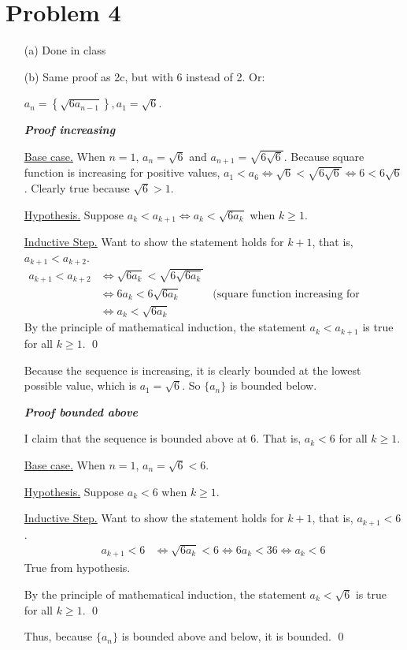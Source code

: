 \documentclass[preview, margin=0.6in]{standalone}
\newcommand*{\problem}[1]{\section*{Problem #1}}
\begin{document}
\problem{4}
\begin{itemize}
	\item[(a)] Done in class
	\item[(b)] Same proof as 2c, but with 6 instead of 2. Or:

$\displaystyle a_n=\left\{\sqrt{6a_{n-1}}\right\},a_1=\sqrt{6}$.

\textbf{\textit{Proof increasing}}

\underline{Base case.} When $n=1$, $a_n=\sqrt{6}$ and $a_{n+1}=\sqrt{6 \sqrt{6}}$. Because square function is increasing for positive values, $a_1<a_6 \iff \sqrt{6} < \sqrt{6 \sqrt{6}} \iff 6 < 6 \sqrt{6}$. Clearly true because $ \sqrt{6}>1$.

\underline{Hypothesis.} Suppose $\displaystyle a_k<a_{k+1}\iff a_k< \sqrt{6a_k}$ when $k\geq1$.

\underline{Inductive Step.}
Want to show the statement holds for $k+1$, that is, $a_{k+1}<a_{k+2}$.
\begin{align*}
	a_{k+1}<a_{k+2}
	&\iff \sqrt{6a_k}< \sqrt{6 \sqrt{6 a_k}} \\
	&\iff 6a_k < 6 \sqrt{6a_k} & \text{(square function increasing for positive values)} \\
	&\iff a_k< \sqrt{6a_k}
\end{align*}
By the principle of mathematical induction, the statement $a_k<a_{k+1}$ is true for all $k\geq 1$. \qed

Because the sequence is increasing, it is clearly bounded at the lowest possible value, which is $a_1= \sqrt{6}$. So $\{a_n\}$ is bounded below.

\textbf{\textit{Proof bounded above}}

I claim that the sequence is bounded above at $6$. That is, $a_k<6$ for all $k\geq1$.

\underline{Base case.} When $n=1$, $a_n=\sqrt{6}<6$.

\underline{Hypothesis.} Suppose $\displaystyle a_k<6$ when $k\geq1$.

\underline{Inductive Step.}
Want to show the statement holds for $k+1$, that is, $a_{k+1}<6$.
\begin{align*}
	a_{k+1}<6
	&\iff \sqrt{6a_k}<6
	\iff 6a_k<36
	\iff a_k<6
\end{align*}
True from hypothesis.

By the principle of mathematical induction, the statement $a_k<\sqrt{6}$ is true for all $k\geq 1$. \qed

Thus, because $\{a_n\}$ is bounded above and below, it is bounded. \qed

\end{itemize}
\end{document}

